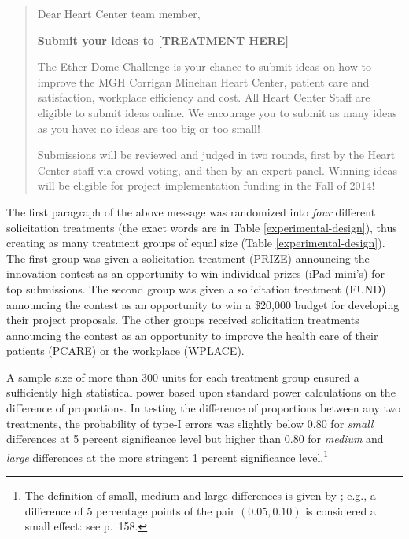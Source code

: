 \documentclass[11pt, titlepage]{article}
\begin{document}
\begin{quote}
Dear Heart Center team member,

\textbf{Submit your ideas to {[}TREATMENT HERE{]}}

The Ether Dome Challenge is your chance to submit ideas on how to
improve the MGH Corrigan Minehan Heart Center, patient care and
satisfaction, workplace efficiency and cost. All Heart Center Staff are
eligible to submit ideas online. We encourage you to submit as many
ideas as you have: no ideas are too big or too small!

Submissions will be reviewed and judged in two rounds, first by the
Heart Center staff via crowd-voting, and then by an expert panel.
Winning ideas will be eligible for project implementation funding in the
Fall of 2014!
\end{quote}

The first paragraph of the above message was randomized into \emph{four}
different solicitation treatments (the exact words are in Table
\ref{experimental-design}), thus creating as many treatment groups of
equal size (Table \ref{experimental-design}). The first group was given
a solicitation treatment (PRIZE) announcing the innovation contest as an
opportunity to win individual prizes (iPad mini's) for top submissions.
The second group was given a solicitation treatment (FUND) announcing
the contest as an opportunity to win a \$20,000 budget for developing
their project proposals. The other groups received solicitation
treatments announcing the contest as an opportunity to improve the
health care of their patients (PCARE) or the workplace (WPLACE).



A sample size of more than 300 units for each treatment group ensured a
sufficiently high statistical power based upon standard power
calculations on the difference of proportions. In testing the difference
of proportions between any two treatments, the probability of type-I
errors was slightly below \(0.80\) for \emph{small} differences at 5
percent significance level but higher than \(0.80\) for \emph{medium}
and \emph{large} differences at the more stringent 1 percent
significance level.\footnote{The definition of small, medium and large
  differences is given by \citet{cohen1992power}; e.g., a difference of
  5 percentage points of the pair \((0.05, 0.10)\) is considered a small
  effect: see \citet{cohen1992power} p.~158.}
\end{document}
